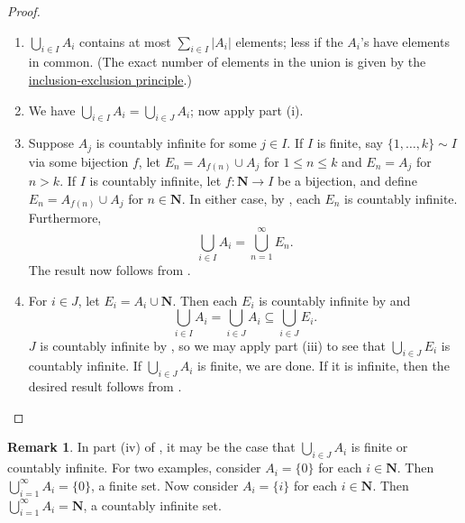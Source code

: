 \documentclass[12pt]{article}
\theoremstyle{definition}
\newtheorem*{remark}{Remark}
\newcommand{\N}{\mathbf{N}}
\begin{document}
\begin{proof}
    \begin{enumerate}[label = (\roman*)]
        \item \( \bigcup_{i \in I} A_i \) contains at most \( \sum_{i \in I} |A_i| \) elements; less if the \( A_i \)'s have elements in common. (The exact number of elements in the union is given by the \href{https://en.wikipedia.org/wiki/Inclusion%E2%80%93exclusion_principle}{inclusion-exclusion principle}.)

        \item We have \( \bigcup_{i \in I} A_i = \bigcup_{i \in J} A_i \); now apply part (i).

        \item Suppose \( A_j \) is countably infinite for some \( j \in I \). If \( I \) is finite, say \( \{ 1, \ldots, k \} \sim I \) via some bijection \( f \), let \( E_n = A_{f(n)} \cup A_j \) for \( 1 \leq n \leq k \) and \( E_n = A_j \) for \( n > k \). If \( I \) is countably infinite, let \( f : \N \to I \) be a bijection, and define \( E_n = A_{f(n)} \cup A_j \) for \( n \in \N \). In either case, by , each \( E_n \) is countably infinite. Furthermore,
        \[
            \bigcup_{i \in I} A_i = \bigcup_{n=1}^{\infty} E_n.
        \]
        The result now follows from .

        \item For \( i \in J \), let \( E_i = A_i \cup \N \). Then each \( E_i \) is countably infinite by  and
        \[
            \bigcup_{i \in I} A_i = \bigcup_{i \in J} A_i \subseteq \bigcup_{i \in J} E_i.
        \]
        \( J \) is countably infinite by , so we may apply part (iii) to see that \( \bigcup_{i \in J} E_i \) is countably infinite. If \( \bigcup_{i \in J} A_i \) is finite, we are done. If it is infinite, then the desired result follows from . \qedhere
    \end{enumerate}
\end{proof}

\begin{remark}
    In part (iv) of , it may be the case that \( \bigcup_{i \in J} A_i \) is finite or countably infinite. For two examples, consider \( A_i = \{ 0 \} \) for each \( i \in \N \). Then \( \bigcup_{i=1}^{\infty} A_i = \{ 0 \} \), a finite set. Now consider \( A_i = \{ i \} \) for each \( i \in \N \). Then \( \bigcup_{i=1}^{\infty} A_i = \N \), a countably infinite set.
\end{remark}
\end{document}

